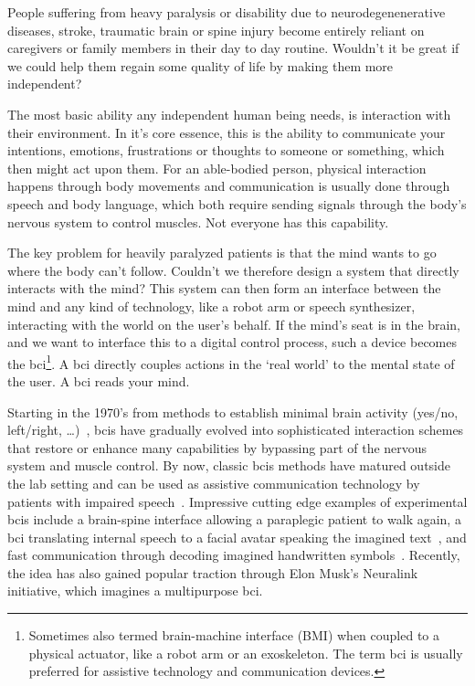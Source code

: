 People suffering from heavy paralysis or disability due to
neurodegenenerative diseases, stroke, traumatic brain or spine injury
become entirely reliant on caregivers or family members in their day to day
routine.
Wouldn't it be great if we could help them regain some quality of life by
making them more independent?

The most basic ability any independent human being needs, is interaction with
their environment.
In it's core essence, this is the ability to communicate your intentions,
emotions, frustrations or thoughts to someone or something, which then might
act upon them.
For an able-bodied person, physical interaction happens through body movements
and communication is usually done through speech and body language, which
both require sending signals through the body's nervous system to control
muscles.
Not everyone has this capability.

The key problem for heavily paralyzed patients is that the mind wants to go
where the body can't follow.
Couldn't we therefore design a system that directly interacts with the mind?
This system can then form an interface between the mind and any kind of
technology, like a robot arm or speech synthesizer, interacting with the world
on the user's behalf.
If the mind's seat is in the brain, and we want to interface this to a digital
control process, such a device becomes the \ac{bci}\footnote{Sometimes also
termed brain-machine interface (BMI) when coupled to a physical actuator, like
a robot arm or an exoskeleton. The term \ac{bci} is usually preferred for
assistive technology and communication devices.}.
A \ac{bci} directly couples actions in the `real world' to the mental state of
the user.
A \ac{bci} reads your mind.

Starting in the 1970's from methods to establish minimal brain activity
(yes/no, left/right, \ldots)~\cite{Wolpaw2002}, \acp{bci} have gradually evolved
into sophisticated interaction schemes that restore or enhance many capabilities
by bypassing part of the nervous system and muscle control.
By now, classic \acp{bci} methods have matured outside the lab setting and can be
used as assistive communication technology by patients with impaired
speech~\cite{Wolpaw2018}.
Impressive cutting edge examples of experimental \acp{bci} include a brain-spine
interface allowing a paraplegic patient to walk again\cite{Lorach2023},
a \ac{bci} translating internal speech to a facial avatar speaking the imagined
text~\cite{Metzger2023}, and fast communication through decoding imagined
handwritten symbols~\cite{Willett2021}.
Recently, the idea has also gained popular traction through Elon Musk's
Neuralink~\cite{Musk2019} initiative, which imagines a multipurpose \ac{bci}.

